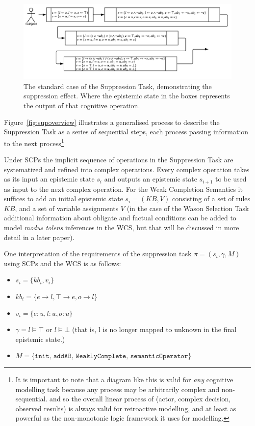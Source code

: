 \documentclass{article}
\begin{document}
\begin{figure}
\begin{center}
 \centering \includegraphics[scale=0.75]{suppressionSCP_normal}
\caption{The standard case of the Suppression Task, demonstrating the suppression effect. Where the epistemic state in the boxes represents the output of that cognitive operation.}
\label {fig:supnormal}
\end{center}
\end{figure}

Figure~\ref{fig:supoverview} illustrates a generalised process to describe the Suppression Task as a series of sequential steps, each process passing information to the next process\footnote{It is important to note that a diagram like this is valid for \textit{any} cognitive modelling task because any process may be arbitrarily complex and non-sequential. and so the overall linear process of (actor, complex decision, observed results) is always valid for retroactive modelling, and at least as powerful as the non-monotonic logic framework it uses for modelling.}

Under SCPs the implicit sequence of operations in the Suppression Task are systematized and refined into complex operations. Every complex operation takes as its input an epistemic state $s_i$ and outputs an epistemic state $s_{i+1}$ to be used as input to the next complex operation. For the Weak Completion Semantics it suffices to add an initial epistemic state $s_i=(KB,V)$ consisting of a set of rules $KB$, and a set of variable assignments $V$ (in the case of the Wason Selection Task additional information about obligate and factual conditions can be added to model \textit{modus tolens} inferences in the WCS, but that will be discussed in more detail in a later paper).

One interpretation of the requirements of the suppression task $\pi=(s_i,\gamma,M)$ using SCPs and the WCS is as follows: 
\begin{itemize}
\item $s_i=\{kb_i, v_i\}$
\item $kb_i=\{e \rightarrow l, \top \rightarrow e, o \rightarrow l\}$
\item $v_i=\{e:u, l:u, o:u\}$
\item $\gamma = l\models \top $ or $l \models \bot$ (that is, l is no longer mapped to unknown in the final epistemic state.)
\item $M=\{\texttt{init, addAB, WeaklyComplete, semanticOperator}\}$
\end{itemize}
\end{document}
